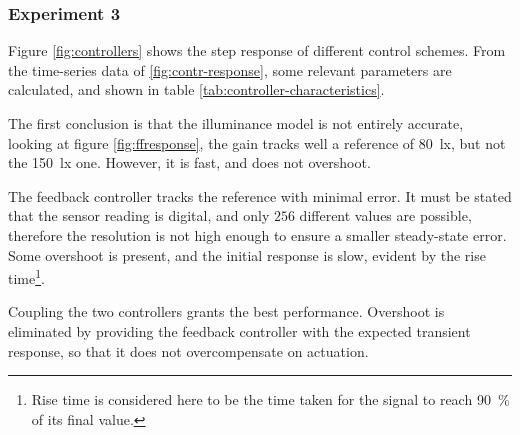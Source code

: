 \documentclass[english,fira]{ist-report}
\begin{document}
\subsubsection*{Experiment 3}

Figure \ref{fig:controllers} shows the step response of different control schemes. 
From the time-series data of \ref{fig:contr-response}, some relevant parameters are calculated, and shown in table \ref{tab:controller-characteristics}.

The first conclusion is that the illuminance model is not entirely accurate, looking at figure \ref{fig:ffresponse}, the gain tracks well a reference of \SI{80}{\lux}, but not the \SI{150}{\lux} one.
However, it is fast, and does not overshoot.

The feedback controller tracks the reference with minimal error. 
It must be stated that the sensor reading is digital, and only $256$ different values are possible, therefore the resolution is not high enough to ensure a smaller steady-state error. 
Some overshoot is present, and the initial response is slow, evident by the rise time\footnote{Rise time is considered here to be the time taken for the signal to reach \SI{90}{\percent} of its final value.}.

Coupling the two controllers grants the best performance. 
Overshoot is eliminated by providing the feedback controller with the expected transient response, so that it does not overcompensate on actuation.
\end{document}
